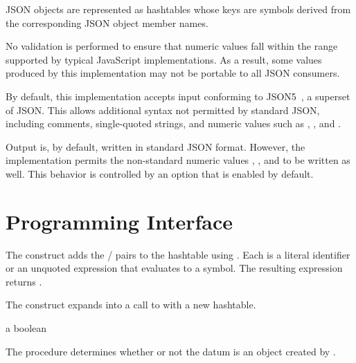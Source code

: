 JSON objects are represented as hashtables whose keys are symbols
derived from the corresponding JSON object member names.

No validation is performed to ensure that numeric values fall within
the range supported by typical JavaScript implementations. As a result,
some values produced by this implementation may not be portable to all
JSON consumers.

By default, this implementation accepts input conforming to
JSON5~\cite{JSON5}, a superset of JSON. This allows additional syntax
not permitted by standard JSON, including comments, single-quoted
strings, and numeric values such as , ,
and .

Output is, by default, written in standard JSON format. However, the
implementation permits the non-standard numeric values
, , and  to be written as
well. This behavior is controlled by an option that is enabled by
default.

\section {Programming Interface}

\begin{syntax}
\end{syntax}

The  construct adds the  /
 pairs to the hashtable  using
. Each  is a literal identifier
or an unquoted expression  that evaluates to a
symbol. The resulting expression returns .

\begin{syntax}
\end{syntax}

The  construct expands into a call to
 with a new hashtable.

\begin{procedure}
\end{procedure}
\returns{} a boolean

The  procedure determines whether or not the datum
 is an object created by .

